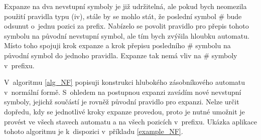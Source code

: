 Expanze na dva nevstupní symboly je již udržitelná, ale pokud bych neomezila použití pravidla typu (iv), stále by se mohlo stát, že poslední symbol $\#$ bude odsunut o~jednu pozici za prefix. Nabízelo se povolit pravidlo pro přepis tohoto symbolu na původní nevstupní symbol, ale tím bych zvýšila hloubku automatu. Místo toho spojuji krok expanze a krok přepisu posledního $\#$ symbolu na původní symbol do jednoho pravidla. Expanze tak nemá vliv na $\#$ symboly v~prefixu.

V~algoritmu \ref{alg_NF} popisuji konstrukci hlubokého zásobníkového automatu v~normální formě. S~ohledem na postupnou expanzi zavádím nové nevstupní symboly, jejichž součástí je rovněž původní pravidlo pro expanzi. Nelze určit dopředu, kdy se jednotlivé kroky expanze provedou, proto je nutné umožnit je provést ve všech stavech automatu a na všech pozicích v~prefixu. 
Ukázka aplikace tohoto algoritmu je k~dispozici v~příkladu \ref{example_NF}.

